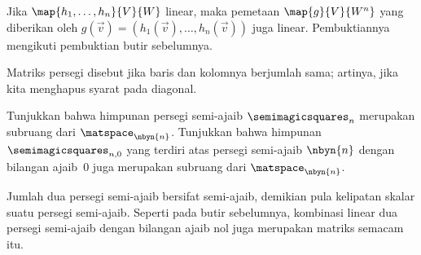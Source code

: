 \begin{exercises}
\begin{answer}
\begin{exparts}
         Jika $\map{h_1,\ldots,h_n}{V}{W}$ linear, maka pemetaan
         $\map{g}{V}{W^n}$ yang diberikan oleh
         $g(\vec{v})=(h_1(\vec{v}), \ldots, h_n(\vec{v}))$
         juga linear. Pembuktiannya mengikuti pembuktian butir sebelumnya.
      \end{exparts}
    \end{answer}
  \item Matriks persegi disebut  jika baris dan kolomnya
     berjumlah sama; artinya, jika kita menghapus syarat pada diagonal.
     \begin{exparts*}
       \partsitem
         Tunjukkan bahwa himpunan persegi semi-ajaib $\semimagicsquares_n$
         merupakan subruang dari $\matspace_{\nbyn{n}}$.
       \partsitem
         Tunjukkan bahwa himpunan $\semimagicsquares_{n,0}$ yang terdiri atas
         persegi semi-ajaib $\nbyn{n}$ dengan bilangan ajaib~$0$ juga merupakan
         subruang dari $\matspace_{\nbyn{n}}$.
     \end{exparts*}
     \begin{answer}
       \begin{exparts*}
         \partsitem
           Jumlah dua persegi semi-ajaib bersifat semi-ajaib, demikian pula
           kelipatan skalar suatu persegi semi-ajaib.
         \partsitem
           Seperti pada butir sebelumnya, kombinasi linear dua persegi
           semi-ajaib dengan bilangan ajaib nol juga merupakan matriks semacam
           itu.
       \end{exparts*}
     \end{answer}

\end{exercises}
